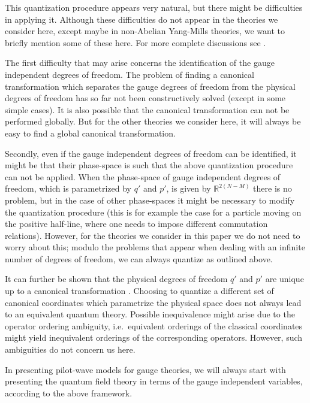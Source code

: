 \documentclass[12pt]{article}
\begin{document}
\begin{itemize}
This quantization procedure appears very natural, but there might be difficulties in applying it. Although these difficulties do not appear in the theories we consider here, except maybe in non-Abelian Yang-Mills theories, we want to briefly mention some of these here. For more complete discussions see \cite{hanson76,sundermeyer82,gitman90,henneaux91}.

The first difficulty that may arise concerns the identification of the gauge independent degrees of freedom. The problem of finding a canonical transformation which separates the gauge degrees of freedom from the physical degrees of freedom has so far not been constructively solved (except in some simple cases). It is also possible that the canonical transformation can not be performed globally. But for the other theories we consider here, it will always be easy to find a global canonical transformation. 

Secondly, even if the gauge independent degrees of freedom can be identified, it might be that their phase-space is such that the above quantization procedure can not be applied. When the phase-space of gauge independent degrees of freedom, which is parametrized by $q'$ and $p'$, is given by ${\mathbb R}^{2(N-M)}$ there is no problem, but in the case of other phase-spaces it might be necessary to modify the quantization procedure \cite{isham84} (this is for example the case for a particle moving on the positive half-line, where one needs to impose different commutation relations). However, for the theories we consider in this paper we do not need to worry about this; modulo the problems that appear when dealing with an infinite number of degrees of freedom, we can always quantize as outlined above. 

It can further be shown that the physical degrees of freedom $q'$ and $p'$ are unique up to a canonical transformation \cite[p.\ 40]{gitman90}. Choosing to quantize a different set of canonical coordinates which parametrize the physical space does not always lead to an equivalent quantum theory. Possible inequivalence might arise due to the operator ordering ambiguity, i.e.\ equivalent orderings of the classical coordinates might yield inequivalent orderings of the corresponding operators. However, such ambiguities do not concern us here. 

In presenting pilot-wave models for gauge theories, we will always start with presenting the quantum field theory in terms of the gauge independent variables, according to the above framework.


\end{itemize}
\end{document}
